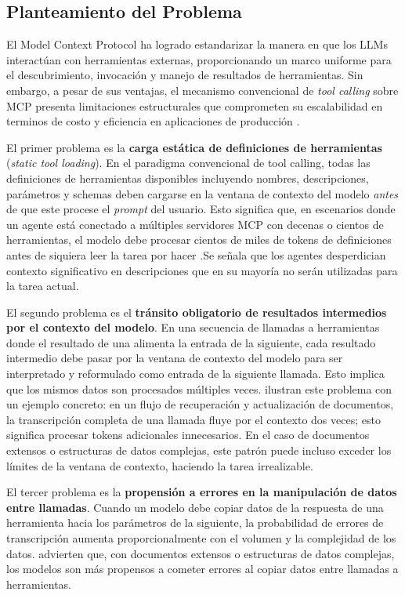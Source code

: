 \subsection{Planteamiento del Problema}

El Model Context Protocol ha logrado estandarizar la manera en que los LLMs
interactúan con herramientas externas, proporcionando un marco uniforme para el
descubrimiento, invocación y manejo de resultados de herramientas. Sin embargo,
a pesar de sus ventajas, el mecanismo
convencional de \textit{tool calling} sobre MCP presenta limitaciones
estructurales que comprometen su escalabilidad en terminos de costo y eficiencia en aplicaciones de producción
\citep{anthropic2024codeexec}.

El primer problema es la \textbf{carga estática de definiciones de herramientas}
(\textit{static tool loading}). En el paradigma convencional de tool calling,
todas las definiciones de herramientas disponibles incluyendo nombres,
descripciones, parámetros y schemas deben cargarse en la ventana de contexto
del modelo \textit{antes} de que este procese el \textit{prompt} del usuario. Esto
significa que, en escenarios donde un agente está conectado a múltiples
servidores MCP con decenas o cientos de herramientas, el modelo debe procesar
cientos de miles de tokens de definiciones antes de siquiera leer la tarea
por hacer \citet{anthropic2024codeexec}.Se señala que los agentes desperdician contexto significativo en
descripciones que en su mayoría no serán utilizadas para la tarea actual.

El segundo problema es el \textbf{tránsito obligatorio de resultados intermedios
por el contexto del modelo}. En una secuencia de llamadas a herramientas donde
el resultado de una alimenta la entrada de la siguiente, cada resultado
intermedio debe pasar por la ventana de contexto del modelo para ser
interpretado y reformulado como entrada de la siguiente llamada. Esto implica
que los mismos datos son procesados múltiples veces.
\citet{anthropic2024codeexec} ilustran este problema con un ejemplo concreto:
en un flujo de recuperación y actualización de documentos, la transcripción
completa de una llamada fluye por el contexto dos veces; esto significa procesar tokens adicionales
innecesarios. En el caso de documentos extensos o estructuras de datos
complejas, este patrón puede incluso exceder los límites de la ventana de
contexto, haciendo la tarea irrealizable.

El tercer problema es la \textbf{propensión a errores en la manipulación de
datos entre llamadas}. Cuando un modelo debe copiar datos de la respuesta de una
herramienta hacia los parámetros de la siguiente, la probabilidad de errores de
transcripción aumenta proporcionalmente con el volumen y la complejidad de los
datos. \citet{anthropic2024codeexec} advierten que, con documentos extensos o
estructuras de datos complejas, los modelos son más propensos a cometer errores
al copiar datos entre llamadas a herramientas.

